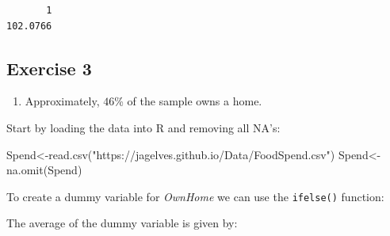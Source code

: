 \documentclass[
  letterpaper,
  DIV=11,
  numbers=noendperiod]{scrreprt}
\newenvironment{Shaded}{\begin{snugshade}}{\end{snugshade}}
\newcommand{\DecValTok}[1]{\textcolor[rgb]{0.68,0.00,0.00}{#1}}
\newcommand{\FunctionTok}[1]{\textcolor[rgb]{0.28,0.35,0.67}{#1}}
\newcommand{\NormalTok}[1]{\textcolor[rgb]{0.00,0.23,0.31}{#1}}
\newcommand{\OtherTok}[1]{\textcolor[rgb]{0.00,0.23,0.31}{#1}}
\newcommand{\SpecialCharTok}[1]{\textcolor[rgb]{0.37,0.37,0.37}{#1}}
\newcommand{\StringTok}[1]{\textcolor[rgb]{0.13,0.47,0.30}{#1}}
\providecommand{\tightlist}{%
  \setlength{\itemsep}{0pt}\setlength{\parskip}{0pt}}\usepackage{longtable,booktabs,array}
\begin{document}
\begin{verbatim}
       1 
102.0766 
\end{verbatim}

\hypertarget{exercise-3-13}{%
\subsection*{Exercise 3}\label{exercise-3-13}}

\begin{blackbox}

\begin{enumerate}
\def\labelenumi{\arabic{enumi}.}
\tightlist
\item
  Approximately, \(46\)\% of the sample owns a home.
\end{enumerate}

\end{blackbox}

Start by loading the data into R and removing all NA's:

\begin{Shaded}
\begin{Highlighting}[numbers=left,,]
\NormalTok{Spend}\OtherTok{\textless{}{-}}\FunctionTok{read.csv}\NormalTok{(}\StringTok{"https://jagelves.github.io/Data/FoodSpend.csv"}\NormalTok{)}
\NormalTok{Spend}\OtherTok{\textless{}{-}}\FunctionTok{na.omit}\NormalTok{(Spend)}
\end{Highlighting}
\end{Shaded}

To create a dummy variable for \emph{OwnHome} we can use the
\texttt{ifelse()} function:

\begin{Shaded}
\end{Shaded}

The average of the dummy variable is given by:

\begin{Shaded}
\end{Shaded}
\end{document}
